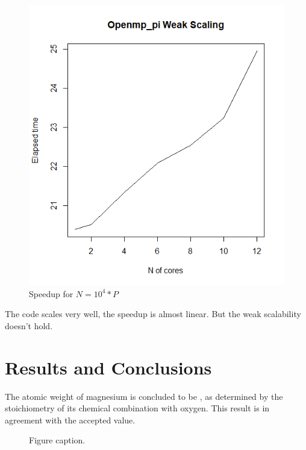 \documentclass{article}
\begin{document}
\begin{figure}[H] %
	\centering
	\includegraphics[width=0.8\columnwidth]{graphs/openmp_pi_weakscaling} %
	\caption{Speedup for $N=10^4*P$}
\end{figure}

The code scales very well, the speedup is almost linear. But the weak scalability doesn't hold.

\section{Results and Conclusions}

The atomic weight of magnesium is concluded to be , as determined by the stoichiometry of its chemical combination with oxygen. This result is in agreement with the accepted value.

\begin{figure}[h]
\begin{center}
\caption{Figure caption.}
\end{center}
\end{figure}

\end{document}
